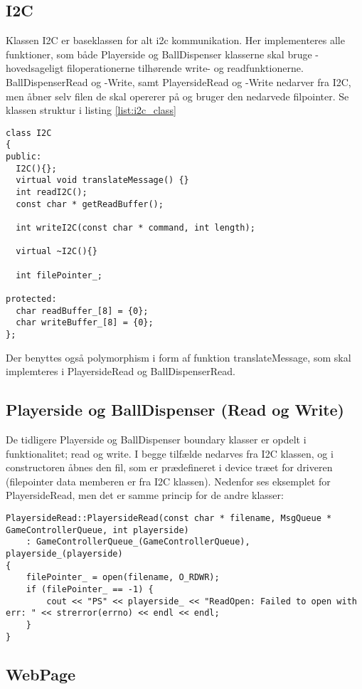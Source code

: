 \documentclass[Softwaredesign/Softwaredesign_main.tex]{subfiles}
\begin{document}
\subsection{I2C}
Klassen I2C er baseklassen for alt i2c kommunikation. Her implementeres alle funktioner, som både Playerside og BallDispenser klasserne skal bruge - hovedsageligt filoperationerne tilhørende write- og readfunktionerne. BallDispenserRead og -Write, samt PlayersideRead og -Write nedarver fra I2C, men åbner selv filen de skal opererer på og bruger den nedarvede filpointer. Se klassen struktur i listing \ref{list:i2c_class}
\begin{lstlisting}[caption={I2C headerfil}, label=list:i2c_class]
class I2C
{
public:
  I2C(){};
  virtual void translateMessage() {}
  int readI2C();
  const char * getReadBuffer();

  int writeI2C(const char * command, int length);

  virtual ~I2C(){}

  int filePointer_;

protected:
  char readBuffer_[8] = {0};
  char writeBuffer_[8] = {0};
};
\end{lstlisting}
Der benyttes også polymorphism i form af funktion translateMessage, som skal implemteres i PlayersideRead og BallDispenserRead. 

\subsection{Playerside og BallDispenser (Read og Write)}
De tidligere Playerside og BallDispenser boundary klasser er opdelt i funktionalitet; read og write. I begge tilfælde nedarves fra I2C klassen, og i constructoren åbnes den fil, som er prædefineret i device træet for driveren (filepointer data memberen er fra I2C klassen). Nedenfor ses eksemplet for PlayersideRead, men det er samme princip for de andre klasser: 
\begin{lstlisting}[caption={PlayersideRead constructor}, label=list:construct]
PlayersideRead::PlayersideRead(const char * filename, MsgQueue * GameControllerQueue, int playerside)
	: GameControllerQueue_(GameControllerQueue), playerside_(playerside)
{
	filePointer_ = open(filename, O_RDWR);
	if (filePointer_ == -1) {
		cout << "PS" << playerside_ << "ReadOpen: Failed to open with err: " << strerror(errno) << endl << endl;
	}
}
\end{lstlisting}

\subsection{WebPage}
\end{document}
